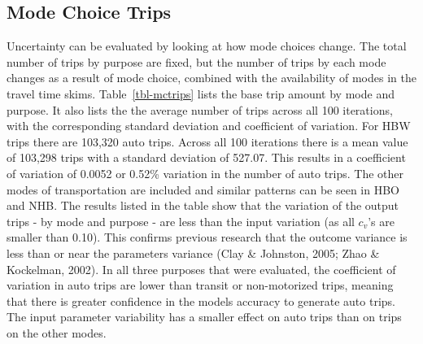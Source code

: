 \documentclass[
  letterpaper,
  number,
  review,
  3p]{elsarticle}
\begin{document}
\subsection{Mode Choice Trips}\label{mode-choice-trips}

Uncertainty can be evaluated by looking at how mode choices change. The
total number of trips by purpose are fixed, but the number of trips by
each mode changes as a result of mode choice, combined with the
availability of modes in the travel time skims. Table~\ref{tbl-mctrips}
lists the base trip amount by mode and purpose. It also lists the the
average number of trips across all 100 iterations, with the
corresponding standard deviation and coefficient of variation. For HBW
trips there are 103,320 auto trips. Across all 100 iterations there is a
mean value of 103,298 trips with a standard deviation of 527.07. This
results in a coefficient of variation of 0.0052 or 0.52\% variation in
the number of auto trips. The other modes of transportation are included
and similar patterns can be seen in HBO and NHB. The results listed in
the table show that the variation of the output trips - by mode and
purpose - are less than the input variation (as all \(c_v\)'s are
smaller than 0.10). This confirms previous research that the outcome
variance is less than or near the parameters variance (Clay \& Johnston,
2005; Zhao \& Kockelman, 2002). In all three purposes that were
evaluated, the coefficient of variation in auto trips are lower than
transit or non-motorized trips, meaning that there is greater confidence
in the models accuracy to generate auto trips. The input parameter
variability has a smaller effect on auto trips than on trips on the
other modes.
\end{document}
